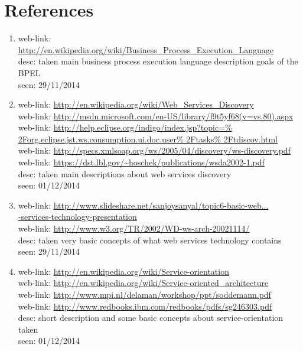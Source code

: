 \section{References}
\begin{enumerate}
\item \label{BPEL description} web-link: \url{http://en.wikipedia.org/wiki/Business_Process_Execution_Language} \\ desc: taken main business process execution language description goals of the BPEL \\ seen: 29/11/2014
\item \label{Web Services Discovery} web-link: \url{http://en.wikipedia.org/wiki/Web_Services_Discovery}  \\ 
web-link: \url{http://msdn.microsoft.com/en-US/library/f9t5yf68(v=vs.80).aspx}  \\
web-link: \url{http://help.eclipse.org/indigo/index.jsp?topic=\% 2Forg.eclipse.jst.ws.consumption.ui.doc.user\% 2Ftasks\% 2Ftdiscov.html}  \\ 
web-link: \url{http://specs.xmlsoap.org/ws/2005/04/discovery/ws-discovery.pdf}  \\
web-link: \url{https://dst.lbl.gov/~hoschek/publications/wsda2002-1.pdf}  \\
desc: taken main descriptions about web services discovery  \\ seen: 01/12/2014 \\
\item \label{Basic Web Services Technology}  web-link: \url{http://www.slideshare.net/sanjoysanyal/topic6-basic-web...}\\ \url{-services-technology-presentation}  \\ 
web-link: \url{http://www.w3.org/TR/2002/WD-ws-arch-20021114/}  \\ desc: taken very basic concepts of what web services technology contains  \\ seen: 29/11/2014  \\
\item \label{Services Orientation} web-link: \url{http://en.wikipedia.org/wiki/Service-orientation}  \\ 
web-link: \url{http://en.wikipedia.org/wiki/Service-oriented_architecture}  \\ 
web-link: \url{http://www.mpi.nl/delaman/workshop/ppt/soddemann.pdf}  \\ 
web-link: \url{http://www.redbooks.ibm.com/redbooks/pdfs/sg246303.pdf}  \\ desc: short description and some basic concepts about service-orientation taken  \\ seen: 01/12/2014  \\

\end{enumerate}
